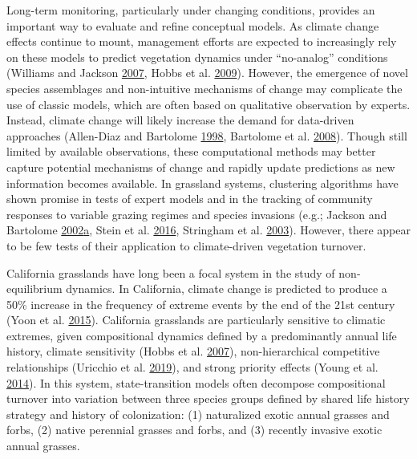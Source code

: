 \documentclass[twoside,12pt,final]{ucthesis-CA2012}
\begin{document}
\begin{ucmainmatter}
Long-term monitoring, particularly under changing conditions, provides an important way to evaluate and refine conceptual models.
As climate change effects continue to mount, management efforts are expected to increasingly rely on these models to predict vegetation dynamics under ``no-analog'' conditions (Williams and Jackson \protect\hyperlink{ref-Williams2007}{2007}, Hobbs et al. \protect\hyperlink{ref-Hobbs2009}{2009}).
However, the emergence of novel species assemblages and non-intuitive mechanisms of change may complicate the use of classic models, which are often based on qualitative observation by experts.
Instead, climate change will likely increase the demand for data-driven approaches (Allen-Diaz and Bartolome \protect\hyperlink{ref-Allen-Diaz1998}{1998}, Bartolome et al. \protect\hyperlink{ref-Bartolome2008}{2008}).
Though still limited by available observations, these computational methods may better capture potential mechanisms of change and rapidly update predictions as new information becomes available.
In grassland systems, clustering algorithms have shown promise in tests of expert models and in the tracking of community responses to variable grazing regimes and species invasions (e.g.; Jackson and Bartolome \protect\hyperlink{ref-Jackson2002a}{2002}\protect\hyperlink{ref-Jackson2002a}{a}, Stein et al. \protect\hyperlink{ref-Stein2016}{2016}, Stringham et al. \protect\hyperlink{ref-Stringham2003}{2003}). However, there appear to be few tests of their application to climate-driven vegetation turnover.

California grasslands have long been a focal system in the study of non-equilibrium dynamics.
In California, climate change is predicted to produce a 50\% increase in the frequency of extreme events by the end of the 21st century (Yoon et al. \protect\hyperlink{ref-Yoon2015}{2015}).
California grasslands are particularly sensitive to climatic extremes, given compositional dynamics defined by a predominantly annual life history, climate sensitivity (Hobbs et al. \protect\hyperlink{ref-Hobbs2007}{2007}), non-hierarchical competitive relationships (Uricchio et al. \protect\hyperlink{ref-Uricchio2019}{2019}), and strong priority effects (Young et al. \protect\hyperlink{ref-Young2014}{2014}).
In this system, state-transition models often decompose compositional turnover into variation between three species groups defined by shared life history strategy and history of colonization: (1) naturalized exotic annual grasses and forbs, (2) native perennial grasses and forbs, and (3) recently invasive exotic annual grasses.


\end{ucmainmatter}
\end{document}
